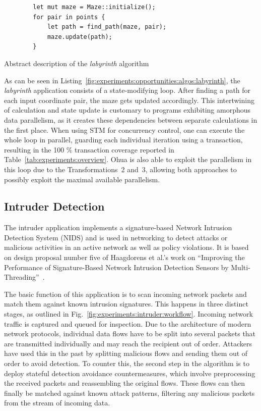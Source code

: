 \begin{listing}
    \begin{verbatim}
        let mut maze = Maze::initialize();
        for pair in points {
            let path = find_path(maze, pair);
            maze.update(path);
        }
    \end{verbatim}
    \caption{Abstract description of the \emph{labyrinth} algorithm}
    \label{fig:experiments:opportunities:algos:labyrinth}
\end{listing}

As can be seen in Listing~\ref{fig:experiments:opportunities:algos:labyrinth}, the \emph{labyrinth} application consists of a state-modifying loop.
After finding a path for each input coordinate pair, the maze gets updated accordingly.
This intertwining of calculation and state update is customary to programs exhibiting amorphous data parallelism, as it creates these dependencies between separate calculations in the first place.
When using STM for concurrency control, one can execute the whole loop in parallel, guarding each individual iteration using a transaction, resulting in the 100 \% transaction coverage reported in Table~\ref{tab:experiments:overview}.
Ohua is also able to exploit the parallelism in this loop due to the Transformations~2 and~3, allowing both approaches to possibly exploit the maximal available parallelism.

\subsection{Intruder Detection}
\label{sec:experiments:intruder}

The intruder application implements a signature-based Network Intrusion Detection System (NIDS) and is used in networking to detect attacks or malicious activities in an active network as well as policy violations.
It is based on design proposal number five of Haagdorens et al.'s work on \enquote{Improving the Performance of Signature-Based Network Intrusion Detection Sensors by Multi-Threading}~\cite{haagdorens2004improving}.

The basic function of this application is to scan incoming network packets and match them against known intrusion signatures.
This happens in three distinct stages, as outlined in Fig.~\ref{fig:experiments:intruder:workflow}.
Incoming network traffic is captured and queued for inspection.
Due to the architecture of modern network protocols, individual data flows have to be split into several packets that are transmitted individually and may reach the recipient out of order.
Attackers have used this in the past by splitting malicious flows and sending them out of order to avoid detection.
To counter this, the second step in the algorithm is to deploy stateful detection avoidance countermeasures, which involve preprocessing the received packets and reassembling the original flows.
These flows can then finally be matched against known attack patterns, filtering any malicious packets from the stream of incoming data.

